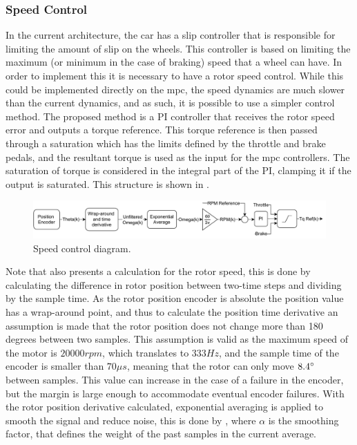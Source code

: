 

\subsubsection{Speed Control}
\label{section:speed_control}%

In the current architecture, the car has a slip controller that is responsible for limiting the amount of slip on the wheels. This controller is based on limiting the maximum (or minimum in the case of braking) speed that a wheel can have. In order to implement this it is necessary to have a rotor speed control. While this could be implemented directly on the \gls{mpc}, the speed dynamics are much slower than the current dynamics, and as such, it is possible to use a simpler control method. The proposed method is a PI controller that receives the rotor speed error and outputs a torque reference. This torque reference is then passed through a saturation which has the limits defined by the throttle and brake pedals, and the resultant torque is used as the input for the \gls{mpc} controllers. The saturation of torque is considered in the integral part of the PI, clamping it if the output is saturated. This structure is shown in .

\begin{figure}[!htb]
	\centering
	\includegraphics[width=1\textwidth]{Figures/Speed_control.pdf}
	\caption[Speed control diagram.]{Speed control diagram.}
	\label{fig:speed_control_diagram}%
\end{figure}

Note that  also presents a calculation for the rotor speed, this is done by calculating the difference in rotor position between two-time steps and dividing by the sample time. As the rotor position encoder is absolute the position value has a wrap-around point, and thus to calculate the position time derivative an assumption is made that the rotor position does not change more than 180 degrees between two samples. This assumption is valid as the maximum speed of the motor is $20000 rpm$, which translates to $333 Hz$, and the sample time of the encoder is smaller than  $70\mu s$, meaning that the rotor can only move $8.4 ^\circ\,$ between samples. This value can increase in the case of a failure in the encoder, but the margin is large enough to accommodate eventual encoder failures. With the rotor position derivative calculated, exponential averaging is applied to smooth the signal and reduce noise, this is done by , where $\alpha$ is the smoothing factor, that defines the weight of the past samples in the current average.

